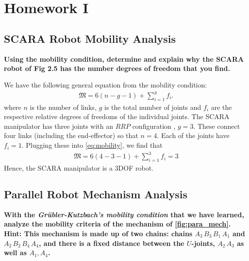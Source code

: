 \section{Homework I}
\subsection{SCARA Robot Mobility Analysis}
\textbf{ Using the mobility condition, determine and explain why the SCARA robot of Fig 2.5 has the number degrees of freedom that you find.}

We have the following general equation from the mobility condition:
\begin{align}
	\mathfrak{M} = 6(n - g - 1) + \sum_{i=1}^{g} f_i.
	\label{eq:mobility}
\end{align}
%
where $n$ is the number of links, $g$ is the total number of joints and $f_i$  are the respective relative degrees of freedoms of the individual joints. The SCARA manipulator has three joints with an $RRP$ configuration \ie, $g=3$. These connect four links (including the end-effector) so that $n = 4$. Each of the joints have $f_i=1$. Plugging these into \eqref{eq:mobility}, we find that
%
\begin{align}
	\mathfrak{M} = 6(4-3-1) + \sum_{i=1}^3 f_i = 3
\end{align}
%
Hence, the SCARA manipulator is a 3DOF robot.

\subsection{Parallel Robot Mechanism Analysis}

\textbf{With the \textit{{Gr\"ubler-Kutzbach's} mobility condition} that we have learned, analyze the mobility criteria of the mechanism of \autoref{fig:para_mech}. Hint: This mechanism is made up of two chains: chains $A_3\, B_3\, B_1\, A_1$ and $A_2\, B_2\, B_4\, A_4$, and there is a fixed distance between the $U$-joints, $A_2\, A_3$ as well as $A_1, A_4$.}


